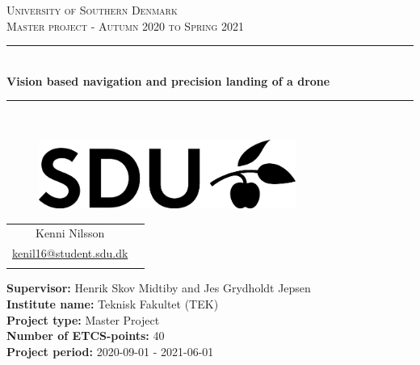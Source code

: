 \documentclass[Report.tex]{subfiles}
\begin{document}
\begin{titlepage}
\begin{center}
\textsc{\LARGE University of Southern Denmark}\\[1.5cm]

\textsc{\large Master project - Autumn 2020 to Spring 2021}\\[0.5cm]
\rule{\linewidth}{0.5mm}\\[0.2cm]
{ \LARGE \bfseries Vision based navigation and precision landing of a drone \\[0.4cm]}
\rule{\linewidth}{0.5mm}\\[1.2cm]

\vspace{2.5cm}

    \begin{figure}[h!]
    \centering
    \includegraphics[width=0.75\textwidth]{../Figures/SDUlogo.png}
    \label{fig:SDUlogo}\\
    [2.5cm]
    \end{figure}


\begin{tabular}{cc}
	\cline{1-1}
	\\
    Kenni Nilsson\\
    \href{mailto:kenil16@student.sdu.dk}{kenil16@student.sdu.dk} \\
	\\	
\end{tabular}	

\vfill

\textbf{Supervisor:} Henrik Skov Midtiby and Jes Grydholdt Jepsen \\
\textbf{Institute name:} Teknisk Fakultet (TEK) \\
\textbf{Project type:} Master Project \\
\textbf{Number of ETCS-points:} 40 \\
\textbf{Project period:} 2020-09-01 - 2021-06-01
\mbox{}\\

\end{center}
\end{titlepage}
\end{document}
